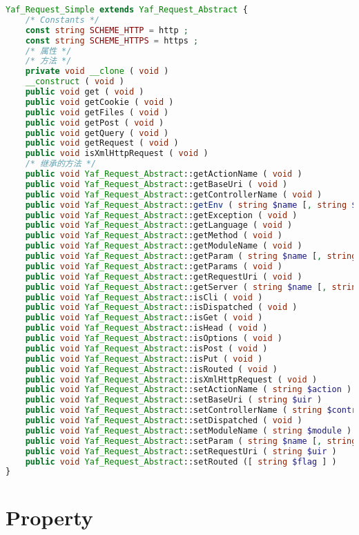 \begin{lstlisting}[language=PHP]
Yaf_Request_Simple extends Yaf_Request_Abstract {
    /* Constants */
    const string SCHEME_HTTP = http ;
    const string SCHEME_HTTPS = https ;
    /* 属性 */
    /* 方法 */
    private void __clone ( void )
    __construct ( void )
    public void get ( void )
    public void getCookie ( void )
    public void getFiles ( void )
    public void getPost ( void )
    public void getQuery ( void )
    public void getRequest ( void )
    public void isXmlHttpRequest ( void )
    /* 继承的方法 */
    public void Yaf_Request_Abstract::getActionName ( void )
    public void Yaf_Request_Abstract::getBaseUri ( void )
    public void Yaf_Request_Abstract::getControllerName ( void )
    public void Yaf_Request_Abstract::getEnv ( string $name [, string $default ] )
    public void Yaf_Request_Abstract::getException ( void )
    public void Yaf_Request_Abstract::getLanguage ( void )
    public void Yaf_Request_Abstract::getMethod ( void )
    public void Yaf_Request_Abstract::getModuleName ( void )
    public void Yaf_Request_Abstract::getParam ( string $name [, string $default ] )
    public void Yaf_Request_Abstract::getParams ( void )
    public void Yaf_Request_Abstract::getRequestUri ( void )
    public void Yaf_Request_Abstract::getServer ( string $name [, string $default ] )
    public void Yaf_Request_Abstract::isCli ( void )
    public void Yaf_Request_Abstract::isDispatched ( void )
    public void Yaf_Request_Abstract::isGet ( void )
    public void Yaf_Request_Abstract::isHead ( void )
    public void Yaf_Request_Abstract::isOptions ( void )
    public void Yaf_Request_Abstract::isPost ( void )
    public void Yaf_Request_Abstract::isPut ( void )
    public void Yaf_Request_Abstract::isRouted ( void )
    public void Yaf_Request_Abstract::isXmlHttpRequest ( void )
    public void Yaf_Request_Abstract::setActionName ( string $action )
    public void Yaf_Request_Abstract::setBaseUri ( string $uir )
    public void Yaf_Request_Abstract::setControllerName ( string $controller )
    public void Yaf_Request_Abstract::setDispatched ( void )
    public void Yaf_Request_Abstract::setModuleName ( string $module )
    public void Yaf_Request_Abstract::setParam ( string $name [, string $value ] )
    public void Yaf_Request_Abstract::setRequestUri ( string $uir )
    public void Yaf_Request_Abstract::setRouted ([ string $flag ] )
}
\end{lstlisting}

\section{Property}


